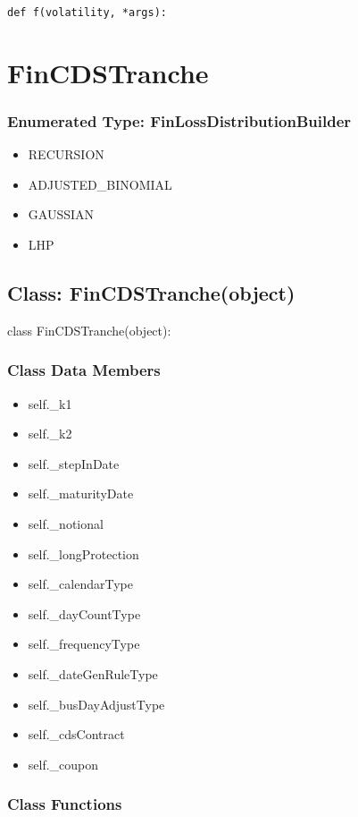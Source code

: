 \documentclass[twoside,11pt]{book}
\begin{document}
\begin{lstlisting}
def f(volatility, *args):
\end{lstlisting}

\newpage
\section{FinCDSTranche}

\subsubsection{Enumerated Type: FinLossDistributionBuilder}
\begin{itemize}
\item{RECURSION}
\item{ADJUSTED\_BINOMIAL}
\item{GAUSSIAN}
\item{LHP}
\end{itemize}

\subsection{Class: FinCDSTranche(object)}
class FinCDSTranche(object):

\subsubsection{Class Data Members}
\begin{itemize}
\item{self.\_k1}
\item{self.\_k2}
\item{self.\_stepInDate}
\item{self.\_maturityDate}
\item{self.\_notional}
\item{self.\_longProtection}
\item{self.\_calendarType}
\item{self.\_dayCountType}
\item{self.\_frequencyType}
\item{self.\_dateGenRuleType}
\item{self.\_busDayAdjustType}
\item{self.\_cdsContract}
\item{self.\_coupon}
\end{itemize}

\subsubsection{Class Functions}
\end{document}
